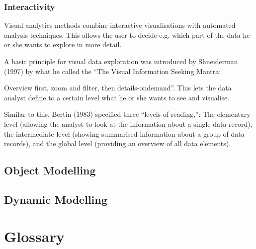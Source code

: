 \documentclass[twoside, english, draft]{Pflichtenheft}
\begin{document}
\subsubsection{Interactivity}

Visual analytics methods combine interactive visualisations with automated analysis
techniques. This allows the user to decide e.g. which part
of the data he or she wants to explore in more detail.

A basic principle for visual data exploration was introduced by Shneiderman (1997) by what he called the “The Visual Information Seeking Mantra:

Overview first, zoom and filter, then details-ondemand”.
This lets the data analyst define to a certain level what he or she wants
to see and visualise.

Similar to this, Bertin (1983) specified three “levels of reading,”:
The elementary level (allowing the analyst to look at the information about a
single data record), the intermediate level (showing summarised information about a group of data records), and the global level (providing an overview of all data elements).

\subsection{Object Modelling}
\subsection{Dynamic Modelling}

\section{Glossary}
\printglossary[title=,toctitle=]



\printbibliography[heading=bibintoc]
\end{document}
